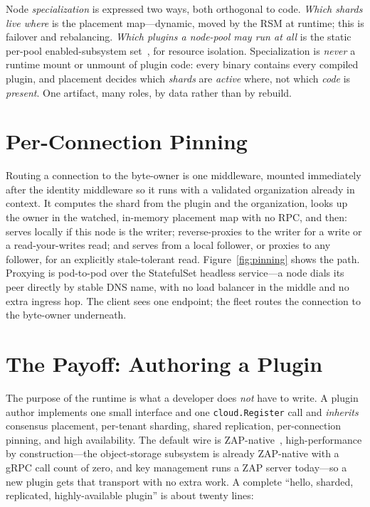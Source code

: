\documentclass[11pt]{article}
\begin{document}
Node \emph{specialization} is expressed two ways, both orthogonal to code.
\emph{Which shards live where} is the placement map---dynamic, moved by the
RSM at runtime; this is failover and rebalancing. \emph{Which plugins a
node-pool may run at all} is the static per-pool enabled-subsystem
set~\cite{hip0106}, for resource isolation. Specialization is \emph{never} a
runtime mount or unmount of plugin code: every binary contains every compiled
plugin, and placement decides which \emph{shards} are \emph{active} where, not
which \emph{code} is \emph{present}. One artifact, many roles, by data rather
than by rebuild.

\section{Per-Connection Pinning}
\label{sec:pinning}

Routing a connection to the byte-owner is one middleware, mounted immediately
after the identity middleware so it runs with a validated organization already
in context. It computes the shard from the plugin and the organization, looks
up the owner in the watched, in-memory placement map with no RPC, and then:
serves locally if this node is the writer; reverse-proxies to the writer for a
write or a read-your-writes read; and serves from a local follower, or proxies
to any follower, for an explicitly stale-tolerant read.
Figure~\ref{fig:pinning} shows the path. Proxying is pod-to-pod over the
StatefulSet headless service---a node dials its peer directly by stable DNS
name, with no load balancer in the middle and no extra ingress hop. The client
sees one endpoint; the fleet routes the connection to the byte-owner
underneath.



\section{The Payoff: Authoring a Plugin}
\label{sec:dx}

The purpose of the runtime is what a developer does \emph{not} have to write.
A plugin author implements one small interface and one \texttt{cloud.Register}
call and \emph{inherits} consensus placement, per-tenant sharding, shared
replication, per-connection pinning, and high availability. The default wire
is ZAP-native~\cite{hip0114}, high-performance by construction---the
object-storage subsystem is already ZAP-native with a gRPC call count of
zero, and key management runs a ZAP server today---so a new plugin gets that
transport with no extra work. A complete ``hello, sharded, replicated,
highly-available plugin'' is about twenty lines:
\end{document}
